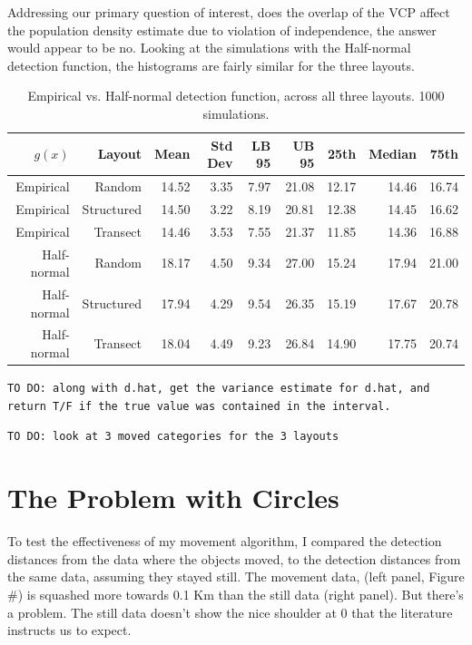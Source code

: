 \documentclass[12pt]{article}
\begin{document}
Addressing our primary question of interest, does the overlap of the VCP affect the population density estimate due to violation of independence, the answer would appear to be no. Looking at the simulations with the Half-normal detection function, the histograms are fairly similar for the three layouts. 

\begin{table}
	\caption{Empirical vs. Half-normal detection function, across all three layouts. 1000 simulations.}
	\begin{tabular}{ r r r r r r r r r}
	   $g(x)$	 & Layout		& Mean	& Std Dev	& LB 95 & UB 95	& 25th	& Median	&  75th \\ \hline \hline
	   Empirical & Random		& 14.52 & 3.35 		& 7.97	& 21.08	& 12.17	& 14.46	& 16.74\\
	   Empirical & Structured	& 14.50 & 3.22 		& 8.19 	& 20.81 & 12.38 & 14.45 & 16.62\\
	   Empirical & Transect		& 14.46 & 3.53 		& 7.55 	& 21.37 & 11.85 & 14.36 & 16.88\\ \hline
	 Half-normal & Random 		& 18.17 & 4.50 		& 9.34 	& 27.00 & 15.24 & 17.94 & 21.00\\
	 Half-normal & Structured	& 17.94 & 4.29 		& 9.54 	& 26.35 & 15.19 & 17.67 & 20.78\\
	 Half-normal & Transect		& 18.04 & 4.49 		& 9.23 	& 26.84 & 14.90 & 17.75 & 20.74\\

	\end{tabular}
	\label{table:sim1}
\end{table}



\texttt{TO DO: along with d.hat, get the variance estimate for d.hat, and return T/F if the true value was contained in the interval.}

\texttt{TO DO: look at 3 moved categories for the 3 layouts}

\section{The Problem with Circles}
To test the effectiveness of my movement algorithm, I compared the detection distances from the data where the objects moved, to the detection distances from the same data, assuming they stayed still. The movement data, (left panel, Figure \#) is squashed more towards 0.1 Km than the still data (right panel). But there's a problem. The still data doesn't show the nice shoulder at 0 that the literature instructs us to expect.
\end{document}
